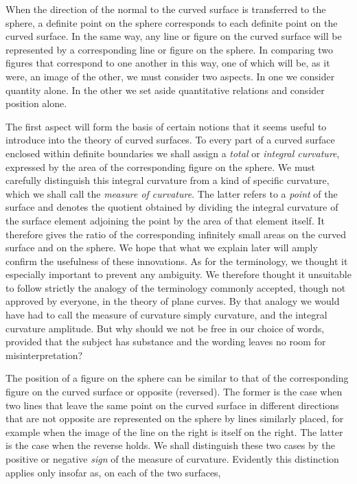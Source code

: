 %
\indent When the direction of the normal to the curved surface is transferred to the sphere, a definite point on the sphere corresponds to each definite point on the curved surface. In the same way, any line or figure on the curved surface will be represented by a corresponding line or figure on the sphere. In comparing two figures that correspond to one another in this way, one of which will be, as it were, an image of the other, we must consider two aspects. In one we consider quantity alone. In the other we set aside quantitative relations and consider position alone.

The first aspect will form the basis of certain notions that it seems useful to introduce into the theory of curved surfaces. To every part of a curved surface enclosed within definite boundaries we shall assign a \textit{total} or \textit{integral curvature}, expressed by the area of the corresponding figure on the sphere. We must carefully distinguish this integral curvature from a kind of specific curvature, which we shall call the \textit{measure of curvature}. The latter refers to a \textit{point} of the surface and denotes the quotient obtained by dividing the integral curvature of the surface element adjoining the point by the area of that element itself. It therefore gives the ratio of the corresponding infinitely small areas on the curved surface and on the sphere. We hope that what we explain later will amply confirm the usefulness of these innovations. As for the terminology, we thought it especially important to prevent any ambiguity. We therefore thought it unsuitable to follow strictly the analogy of the terminology commonly accepted, though not approved by everyone, in the theory of plane curves. By that analogy we would have had to call the measure of curvature simply curvature, and the integral curvature amplitude. But why should we not be free in our choice of words, provided that the subject has substance and the wording leaves no room for misinterpretation?

The position of a figure on the sphere can be similar to that of the corresponding figure on the curved surface or opposite (reversed). The former is the case when two lines that leave the same point on the curved surface in different directions that are not opposite are represented on the sphere by lines similarly placed, for example when the image of the line on the right is itself on the right. The latter is the case when the reverse holds. We shall distinguish these two cases by the positive or negative \textit{sign} of the measure of curvature. Evidently this distinction applies only insofar as, on each of the two surfaces, %
